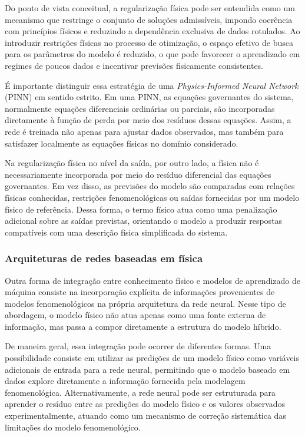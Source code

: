 Do ponto de vista conceitual, a regularização física pode ser entendida como um mecanismo que restringe o conjunto de soluções admissíveis, impondo coerência com princípios físicos e reduzindo a dependência exclusiva de dados rotulados. Ao introduzir restrições físicas no processo de otimização, o espaço efetivo de busca para os parâmetros do modelo é reduzido, o que pode favorecer o aprendizado em regimes de poucos dados e incentivar previsões fisicamente consistentes.

É importante distinguir essa estratégia de uma \textit{Physics-Informed Neural Network} (PINN) em sentido estrito. Em uma PINN, as equações governantes do sistema, normalmente equações diferenciais ordinárias ou parciais, são incorporadas diretamente à função de perda por meio dos resíduos dessas equações. Assim, a rede é treinada não apenas para ajustar dados observados, mas também para satisfazer localmente as equações físicas no domínio considerado.

Na regularização física no nível da saída, por outro lado, a física não é necessariamente incorporada por meio do resíduo diferencial das equações governantes. Em vez disso, as previsões do modelo são comparadas com relações físicas conhecidas, restrições fenomenológicas ou saídas fornecidas por um modelo físico de referência. Dessa forma, o termo físico atua como uma penalização adicional sobre as saídas previstas, orientando o modelo a produzir respostas compatíveis com uma descrição física simplificada do sistema.


\subsubsection{Arquiteturas de redes baseadas em física}
\label{subsec:arquiteturas_fisicas}

Outra forma de integração entre conhecimento físico e modelos de
aprendizado de máquina consiste na incorporação explícita de
informações provenientes de modelos fenomenológicos na própria
arquitetura da rede neural. Nesse tipo de abordagem, o modelo físico
não atua apenas como uma fonte externa de informação, mas passa a
compor diretamente a estrutura do modelo híbrido.

De maneira geral, essa integração pode ocorrer de diferentes formas.
Uma possibilidade consiste em utilizar as predições de um modelo
físico como variáveis adicionais de entrada para a rede neural,
permitindo que o modelo baseado em dados explore diretamente a
informação fornecida pela modelagem fenomenológica. Alternativamente,
a rede neural pode ser estruturada para aprender o resíduo entre as
predições do modelo físico e os valores observados experimentalmente,
atuando como um mecanismo de correção sistemática das limitações do
modelo fenomenológico.

